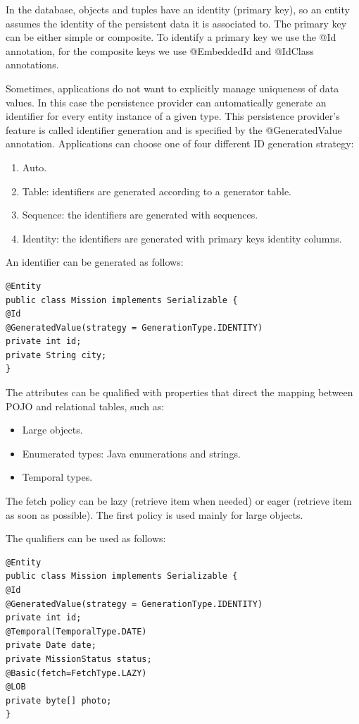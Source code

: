     In the database, objects and tuples have an identity (primary key), so an entity assumes the identity of the persistent data it is associated to. The primary key can be 
    either simple or composite. To identify a primary key we use the @Id annotation, for the composite keys we use @EmbeddedId and @IdClass annotations. 
    
    Sometimes, applications do not want to explicitly manage uniqueness of data values. In this case the persistence provider can automatically generate an identifier 
    for every entity instance of a given type. This persistence provider's feature is called identifier generation and is specified by the @GeneratedValue annotation. 
    Applications can choose one of four different ID generation strategy: 
    \begin{enumerate}
        \item Auto. 
        \item Table: identifiers are generated according to a generator table.
        \item Sequence: the identifiers are generated with sequences. 
        \item Identity: the identifiers are generated with primary keys identity columns. 
    \end{enumerate}
    \begin{example}
        An identifier can be generated as follows: 
        \begin{lstlisting}[style=Java]
@Entity
public class Mission implements Serializable {
@Id
@GeneratedValue(strategy = GenerationType.IDENTITY)
private int id;
private String city;
}
        \end{lstlisting}
    \end{example}
    The attributes can be qualified with properties that direct the mapping between POJO and relational tables, such as: 
    \begin{itemize}
        \item Large objects.
        \item Enumerated types: Java enumerations and strings. 
        \item Temporal types.
    \end{itemize}
    The fetch policy can be lazy (retrieve item when needed) or eager (retrieve item as soon as possible). The first policy is used mainly for large objects. 
    \begin{example}
        The qualifiers can be used as follows: 
        \begin{lstlisting}[style=Java]
@Entity
public class Mission implements Serializable {
@Id
@GeneratedValue(strategy = GenerationType.IDENTITY)
private int id;
@Temporal(TemporalType.DATE)
private Date date;
private MissionStatus status;
@Basic(fetch=FetchType.LAZY)
@LOB
private byte[] photo;
}
        \end{lstlisting}
    \end{example}
